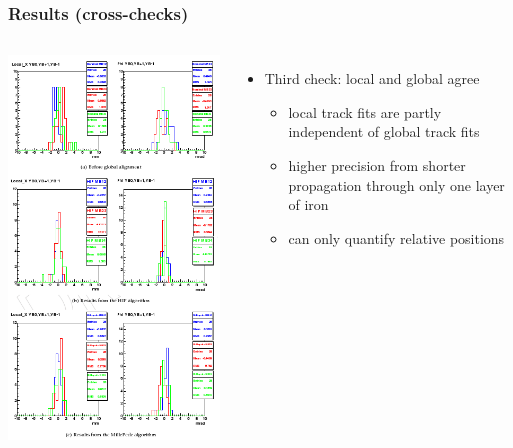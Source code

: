 \documentclass[compress]{beamer}
\begin{document}
\begin{frame}
\frametitle{Results (cross-checks)}

\begin{columns}
\includegraphics[width=\linewidth]{localcheck.png}

\begin{itemize}
\item Third check: local and global agree
\begin{itemize}
\item local track fits are partly independent of global track fits
\item higher precision from shorter propagation through only one layer of iron
\item can only quantify relative positions
\end{itemize}


\end{itemize}
\end{columns}
\end{frame}
\end{document}

